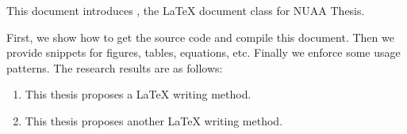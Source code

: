 \begin{abstract}
    本文介绍如何使用\nuaathesis{} 文档类撰写南京航空航天大学学位论文。
    
    首先介绍如何获取并编译本文档，然后展示论文部件的实例，最后列举部分常用宏包的使用方法，取得的研究成果如下：
    
    \begin{enumerate}[leftmargin=0pt,labelsep=0pt,itemindent=2\ccwd+3.5ex,listparindent=2\ccwd,label={(\arabic*)\ }]
        \item 提出了一种 \LaTeX{} 写作方法。
        
        \item 提出了另一种 \LaTeX{} 写作方法。
    \end{enumerate}
\end{abstract}

\begin{abstractEn}
    This document introduces \nuaathesis, the \LaTeX{} document class for NUAA Thesis.

    First, we show how to get the source code and compile this document.
    Then we provide snippets for figures, tables, equations, etc.
    Finally we enforce some usage patterns.
    The research results are as follows:

    \begin{enumerate}[leftmargin=0pt,itemindent=2.4em,labelsep=*,label=(\arabic*)]
        \item This thesis proposes a \LaTeX{} writing method.
        
        \item This thesis proposes another \LaTeX{} writing method.
    \end{enumerate}
\end{abstractEn}
